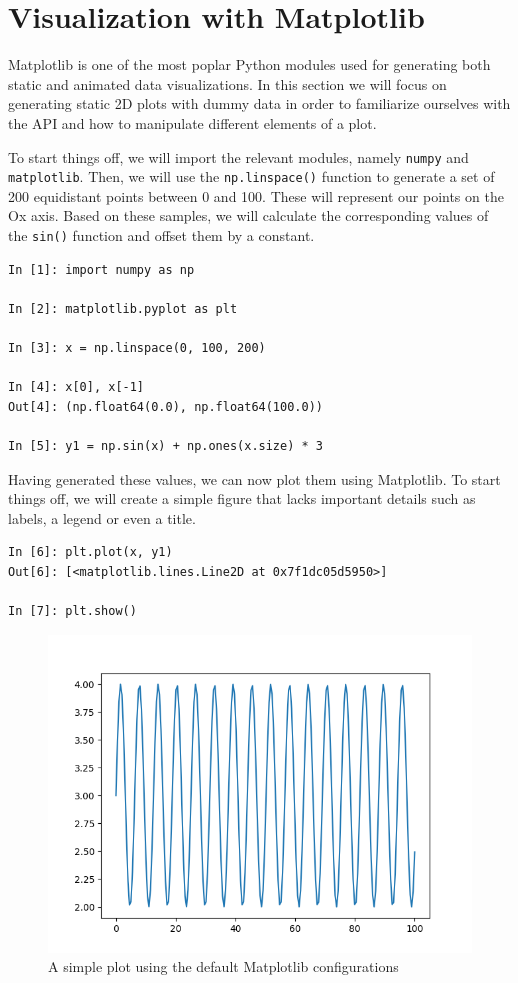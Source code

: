 \section{Visualization with Matplotlib}

Matplotlib is one of the most poplar Python modules used for generating both
static and animated data visualizations. In this section we will focus on
generating static 2D plots with dummy data in order to familiarize ourselves
with the API and how to manipulate different elements of a plot.

To start things off, we will import the relevant modules, namely \texttt{numpy}
and \texttt{matplotlib}. Then, we will use the \texttt{np.linspace()} function
to generate a set of 200 equidistant points between 0 and 100. These will
represent our points on the Ox axis. Based on these samples, we will calculate
the corresponding values of the \texttt{sin()} function and offset them by a
constant.

\begin{lstlisting}[style=pythonstyle]
In [1]: import numpy as np

In [2]: matplotlib.pyplot as plt

In [3]: x = np.linspace(0, 100, 200)

In [4]: x[0], x[-1]
Out[4]: (np.float64(0.0), np.float64(100.0))

In [5]: y1 = np.sin(x) + np.ones(x.size) * 3
\end{lstlisting}

Having generated these values, we can now plot them using Matplotlib. To start
things off, we will create a simple figure that lacks important details such as
labels, a legend or even a title.

\begin{lstlisting}[style=pythonstyle]
In [6]: plt.plot(x, y1)
Out[6]: [<matplotlib.lines.Line2D at 0x7f1dc05d5950>]

In [7]: plt.show()
\end{lstlisting}

\begin{figure}
    \centering
    \includegraphics[width=0.55 \textwidth,keepaspectratio]{figures/figure-1.png}
    \caption{A simple plot using the default Matplotlib configurations}
    \label{fig:simple}
\end{figure}

